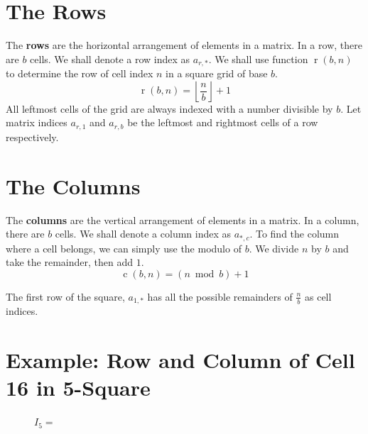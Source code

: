 \documentclass[twoside,openany,12pt]{book}
\begin{document}
    \section{The Rows} \label{rows}
    The \textbf{rows} are the horizontal arrangement of elements in a matrix. In a row, there are $b$ cells. We shall denote a row index as $a_{r,*}$. We shall use function $\operatorname{r}(b,n)$ to determine the row of cell index $n$ in a square grid of base $b$.
    \begin{equation}
      \operatorname{r}(b,n) = \left\lfloor \frac{n}{b} \right\rfloor + 1
    \end{equation}
    All leftmost cells of the grid are always indexed with a number divisible by $b$. Let matrix indices $a_{r,1}$ and $a_{r,b}$ be the leftmost and rightmost cells of a row respectively.

    \section{The Columns} \label{columns}
    The \textbf{columns} are the vertical arrangement of elements in a matrix. In a column, there are $b$ cells. We shall denote a column index as $a_{*,c}$. To find the column where a cell belongs, we can simply use the modulo of $b$. We divide $n$ by $b$ and take the remainder, then add $1$.
    \begin{equation}
      \operatorname{c}(b,n) = (n\bmod b) + 1
    \end{equation}

    The first row of the square, $a_{1,*}$ has all the possible remainders of $\frac{n}{b}$ as cell indices.

    \newpage

    \section{Example: Row and Column of Cell 16 in 5-Square}
    \label{1_example_1}
    \begin{figure}[h]
        \centering
        \setcounter{MaxMatrixCols}{25}
            \centering
            $I_5 =$
    \end{figure}
\end{document}
